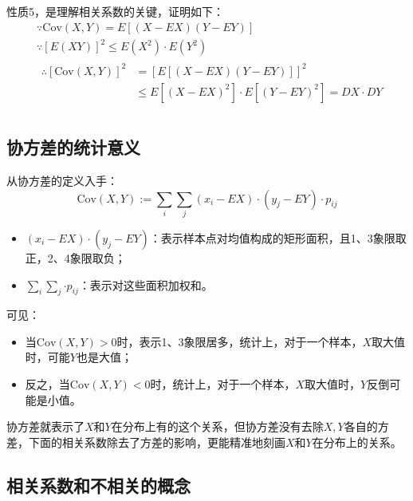性质5，是理解相关系数的关键，证明如下：
\begin{align*}
&\because \mathrm{Cov}\left( X,Y \right) =E\left[ \left( X-EX \right) \left( Y-EY \right) \right] \\
&\because \left[ E\left( XY \right) \right] ^2\leqslant E\left( X^2 \right) \cdot E\left( Y^2 \right) \\
&\begin{aligned}
	\therefore \left[ \mathrm{Cov}\left( X,Y \right) \right] ^2&=\left[ E\left[ \left( X-EX \right) \left( Y-EY \right) \right] \right] ^2\\
	&\leqslant E\left[ \left( X-EX \right) ^2 \right] \cdot E\left[ \left( Y-EY \right) ^2 \right] =DX\cdot DY\\
\end{aligned}
\end{align*}

\subsection{协方差的统计意义}
从协方差的定义入手：
\[
\mathrm{Cov}\left( X,Y \right) :=\sum_i{\sum_j{\left( x_i-EX \right) \cdot \left( y_j-EY \right) \cdot p_{ij}}}
\]

\begin{itemize}
    \item $\left( x_i-EX \right) \cdot \left( y_j-EY \right) $：表示样本点对均值构成的矩形面积，且1、3象限取正，2、4象限取负；
    \item $\sum_i{\sum_j{\cdot p_{ij}}}$：表示对这些面积加权和。
\end{itemize}
可见：
\begin{itemize}
    \item 当$\mathrm{Cov}\left( X,Y \right) >0$时，表示1、3象限居多，统计上，对于一个样本，$X$取大值时，可能$Y$也是大值；
    \item 反之，当$\mathrm{Cov}\left( X,Y \right) <0$时，统计上，对于一个样本，$X$取大值时，$Y$反倒可能是小值。
\end{itemize}
协方差就表示了$X$和$Y$在分布上有的这个关系，但协方差没有去除$X,Y$各自的方差，下面的相关系数除去了方差的影响，更能精准地刻画$X$和$Y$在分布上的关系。

\subsection{相关系数和不相关的概念}

